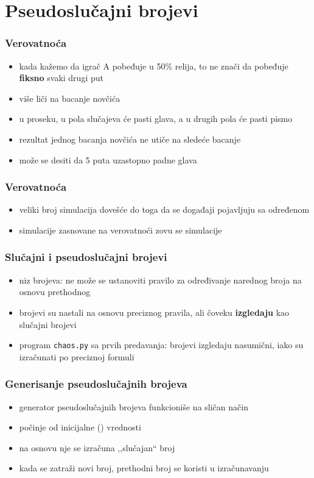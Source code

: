 \documentclass[utf8,compress]{beamer}
\begin{document}
\section[Random]{Pseudoslučajni brojevi}

\begin{frame}
  \frametitle{Verovatnoća}
  \begin{itemize}
    \item kada kažemo da igrač A pobeđuje u 50\% relija, to ne znači da pobeđuje \textbf{fiksno} svaki drugi put
    \item više liči na bacanje novčića
    \item u proseku, u pola slučajeva će pasti glava, a u drugih pola će pasti pismo
    \item rezultat jednog bacanja novčića ne utiče na sledeće bacanje
    \item može se desiti da 5 puta uzastopno padne glava
  \end{itemize}
\end{frame}

\begin{frame}
  \frametitle{Verovatnoća}
  \begin{itemize}
    \item veliki broj simulacija dovešće do toga da se događaji pojavljuju sa određenom 
    \item simulacije zasnovane na verovatnoći zovu se  simulacije
  \end{itemize}
\end{frame}

\begin{frame}
  \frametitle{Slučajni i pseudoslučajni brojevi}
  \begin{itemize}
    \item niz  brojeva: ne može se ustanoviti pravilo za određivanje narednog broja na osnovu prethodnog
    \item {} brojevi su nastali na osnovu preciznog pravila, ali čoveku \textbf{izgledaju} kao slučajni brojevi
    \item program \texttt{chaos.py} sa prvih predavanja: brojevi izgledaju nasumični, iako su izračunati po preciznoj formuli
  \end{itemize}
\end{frame}

\begin{frame}
  \frametitle{Generisanje pseudoslučajnih brojeva}
  \begin{itemize}
    \item generator pseudoslučajnih brojeva funkcioniše na sličan način
    \item počinje od inicijalne () vrednosti
    \item na osnovu nje se izračuna ,,slučajan`` broj
    \item kada se zatraži novi broj, prethodni broj se koristi u izračunavanju
  \end{itemize}
\end{frame}
\end{document}
